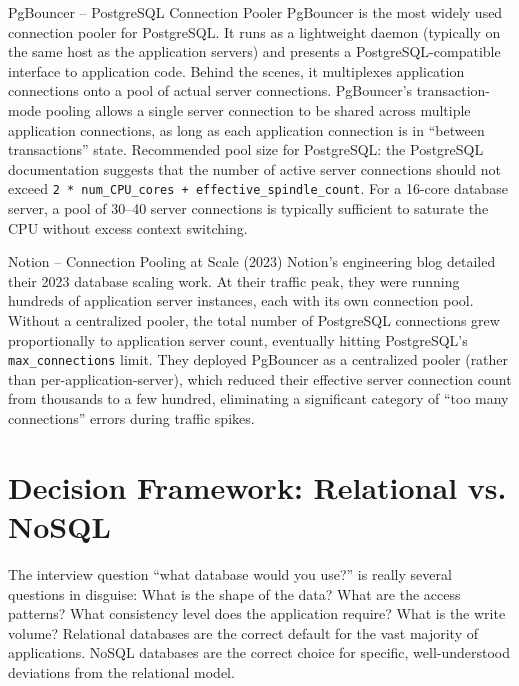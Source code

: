 \documentclass[11pt,a4paper]{article}
\begin{document}
\begin{termbox}{PgBouncer -- PostgreSQL Connection Pooler}
PgBouncer is the most widely used connection pooler for PostgreSQL. It runs as a lightweight daemon (typically on the same host as the application servers) and presents a PostgreSQL-compatible interface to application code. Behind the scenes, it multiplexes application connections onto a pool of actual server connections. PgBouncer's transaction-mode pooling allows a single server connection to be shared across multiple application connections, as long as each application connection is in ``between transactions'' state. Recommended pool size for PostgreSQL: the PostgreSQL documentation suggests that the number of active server connections should not exceed \texttt{2 * num\_CPU\_cores + effective\_spindle\_count}. For a 16-core database server, a pool of 30--40 server connections is typically sufficient to saturate the CPU without excess context switching.
\end{termbox}

\begin{industrybox}{Notion -- Connection Pooling at Scale (2023)}
Notion's engineering blog detailed their 2023 database scaling work. At their traffic peak, they were running hundreds of application server instances, each with its own connection pool. Without a centralized pooler, the total number of PostgreSQL connections grew proportionally to application server count, eventually hitting PostgreSQL's \texttt{max\_connections} limit. They deployed PgBouncer as a centralized pooler (rather than per-application-server), which reduced their effective server connection count from thousands to a few hundred, eliminating a significant category of ``too many connections'' errors during traffic spikes.
\end{industrybox}

\newpage

\section{Decision Framework: Relational vs. NoSQL}

The interview question ``what database would you use?'' is really several questions in disguise: What is the shape of the data? What are the access patterns? What consistency level does the application require? What is the write volume? Relational databases are the correct default for the vast majority of applications. NoSQL databases are the correct choice for specific, well-understood deviations from the relational model.
\end{document}
